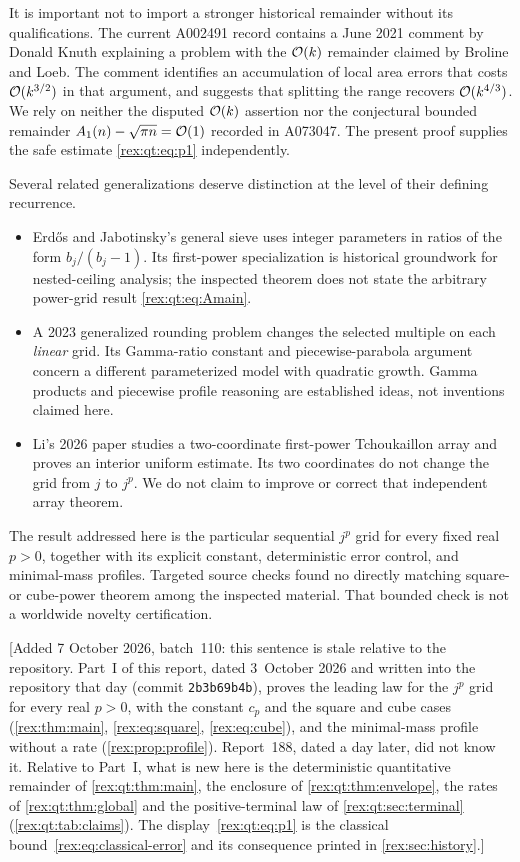 It is important not to import a stronger historical remainder without its qualifications. The current A002491 record contains a June 2021 comment by Donald Knuth explaining a problem with the $\mathcal O(k)$ remainder claimed by Broline and Loeb. The comment identifies an accumulation of local area errors that costs $\mathcal O(k^{3/2})$ in that argument, and suggests that splitting the range recovers $\mathcal O(k^{4/3})$. We rely on neither the disputed $\mathcal O(k)$ assertion nor the conjectural bounded remainder $A_1(n)-\sqrt{\pi n}=\mathcal O(1)$ recorded in A073047. The present proof supplies the safe estimate \eqref{rex:qt:eq:p1} independently.

Several related generalizations deserve distinction at the level of their defining recurrence.
\begin{itemize}
 \item Erd\H{o}s and Jabotinsky's general sieve uses integer parameters in ratios of the form $b_j/(b_j-1)$. Its first-power specialization is historical groundwork for nested-ceiling analysis; the inspected theorem does not state the arbitrary power-grid result \eqref{rex:qt:eq:Amain}.
 \item A 2023 generalized rounding problem \cite{lehericy} changes the selected multiple on each \emph{linear} grid. Its Gamma-ratio constant and piecewise-parabola argument concern a different parameterized model with quadratic growth. Gamma products and piecewise profile reasoning are established ideas, not inventions claimed here.
 \item Li's 2026 paper \cite{li} studies a two-coordinate first-power Tchoukaillon array and proves an interior uniform estimate. Its two coordinates do not change the grid from $j$ to $j^p$. We do not claim to improve or correct that independent array theorem.
\end{itemize}
The result addressed here is the particular sequential $j^p$ grid for every fixed real $p>0$, together with its explicit constant, deterministic error control, and minimal-mass profiles. Targeted source checks found no directly matching square- or cube-power theorem among the inspected material. That bounded check is not a worldwide novelty certification.

[Added 7 October 2026, batch~110: this sentence is stale relative to the
repository. Part~I of this report, dated 3~October 2026 and written into
the repository that day (commit \texttt{2b3b69b4b}), proves the leading law
for the $j^p$ grid for every real $p>0$, with the constant $c_p$ and the
square and cube cases (\cref{rex:thm:main}, \eqref{rex:eq:square},
\eqref{rex:eq:cube}), and the minimal-mass profile without a rate
(\cref{rex:prop:profile}). Report~188, dated a day later, did not know
it. Relative to Part~I, what is new here is the deterministic quantitative
remainder of \cref{rex:qt:thm:main}, the enclosure of
\cref{rex:qt:thm:envelope}, the rates of \cref{rex:qt:thm:global} and the
positive-terminal law of \cref{rex:qt:sec:terminal}
(\cref{rex:qt:tab:claims}). The display~\eqref{rex:qt:eq:p1} is the
classical bound~\eqref{rex:eq:classical-error} and its consequence printed
in \cref{rex:sec:history}.]

